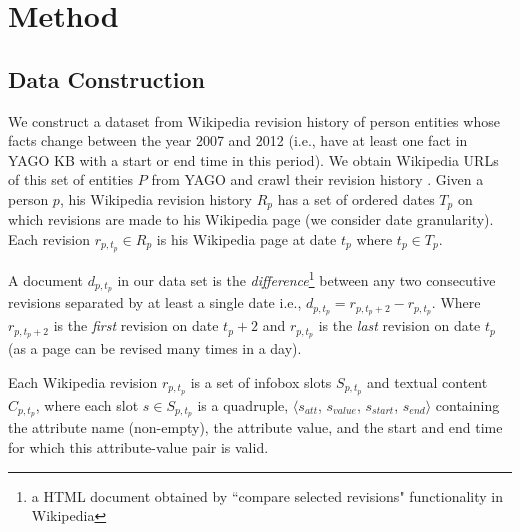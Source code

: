 \section{Method} \label{sec:method}

\subsection{Data Construction} \label{sec:data}
We construct a dataset from Wikipedia revision history of person entities whose facts change between the year 2007 and 2012 (i.e., have at least one fact in YAGO KB \cite{suchanek2007yago} with a start or end time in this period). We obtain Wikipedia URLs of this set of entities $P$ from YAGO and crawl their revision history%
. Given a person $p$, his Wikipedia revision history $R_p$ has a set of ordered dates $T_p$ on which revisions are made to his Wikipedia page (we consider date granularity). Each revision $r_{p, t_p} \in R_p$ is his Wikipedia page at date $t_p$ where $t_p \in T_p$. 

A document $d_{p, t_p}$ in our data set is the \textit{difference}\footnote{a HTML document obtained by ``compare selected revisions"  functionality in Wikipedia} between any two consecutive revisions separated by at least a single date i.e., $d_{p, t_p} = r_{p, t_p+2} - r_{p, t_p}$. Where $r_{p, t_p+2}$ is the \textit{first} revision on date $t_p+2$ and $r_{p, {t_p}}$ is the \textit{last} revision on date $t_p$ (as a page can be revised many times in a day). 


Each Wikipedia revision $r_{p, t_p}$ is a set of infobox slots $S_{p, t_p}$ and textual content $C_{p, t_p}$, where each slot $s \in S_{p, t_p}$ is a quadruple, $\langle s_{att}$, $s_{value}$,  $s_{start}$, $s_{end} \rangle$ containing the attribute name (non-empty), the attribute value, and the start and end time for which this attribute-value pair is valid. 


